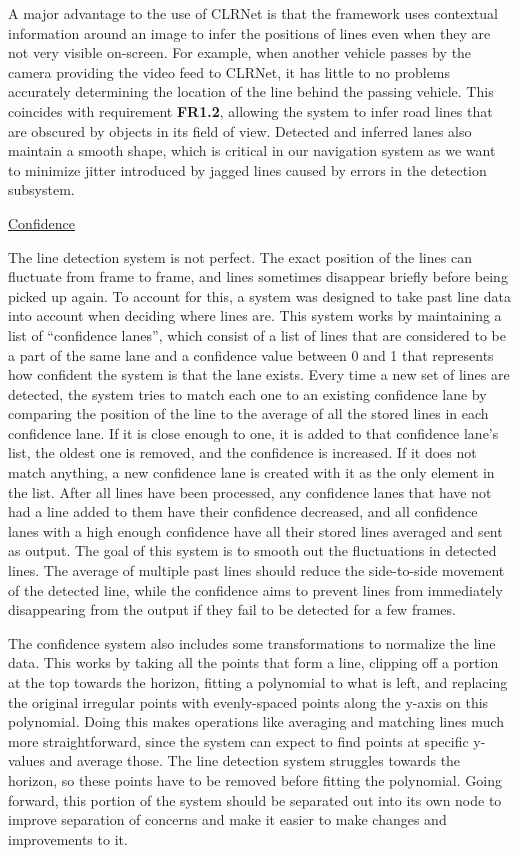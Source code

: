\documentclass[titlepage,draft]{article}
\begin{document}
{A major advantage to the use of CLRNet is that the framework uses contextual information around an image to infer the positions
of lines even when they are not very visible on-screen.
For example, when another vehicle passes by the camera providing the video feed to CLRNet, it has little to no problems
accurately determining the location of the line behind the passing vehicle.
This coincides with requirement \textbf{FR1.2}, allowing the system to infer road lines that are obscured by objects in its field
of view.
Detected and inferred lanes also maintain a smooth shape, which is critical in our navigation system as we want to minimize
jitter introduced by jagged lines caused by errors in the detection subsystem.

\underline{Confidence}

The line detection system is not perfect. The exact position of the lines can fluctuate from frame to frame, and lines sometimes disappear briefly before being picked up again. To account for this, a system was designed to take past line data into account when deciding where lines are. This system works by maintaining a list of ``confidence lanes'', which consist of a list of lines that are considered to be a part of the same lane and a confidence value between 0 and 1 that represents how confident the system is that the lane exists. Every time a new set of lines are detected, the system tries to match each one to an existing confidence lane by comparing the position of the line to the average of all the stored lines in each confidence lane. If it is close enough to one, it is added to that confidence lane's list, the oldest one is removed, and the confidence is increased. If it does not match anything, a new confidence lane is created with it as the only element in the list. After all lines have been processed, any confidence lanes that have not had a line added to them have their confidence decreased, and all confidence lanes with a high enough confidence have all their stored lines averaged and sent as output. The goal of this system is to smooth out the fluctuations in detected lines. The average of multiple past lines should reduce the side-to-side movement of the detected line, while the confidence aims to prevent lines from immediately disappearing from the output if they fail to be detected for a few frames.

The confidence system also includes some transformations to normalize the line data. This works by taking all the points that form a line, clipping off a portion at the top towards the horizon, fitting a polynomial to what is left, and replacing the original irregular points with evenly-spaced points along the y-axis on this polynomial. Doing this makes operations like averaging and matching lines much more straightforward, since the system can expect to find points at specific y-values and average those. The line detection system struggles towards the horizon, so these points have to be removed before fitting the polynomial. Going forward, this portion of the system should be separated out into its own node to improve separation of concerns and make it easier to make changes and improvements to it.

}
\end{document}
